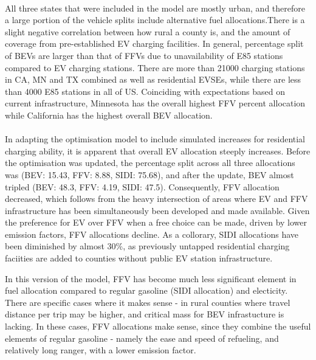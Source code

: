 \documentclass[answers]{exam}
\begin{document}
\\
All three states that were included in the model are mostly urban, and therefore a large portion of the vehicle splits include alternative fuel allocations.There is a slight negative correlation between how rural a county is, and the amount of coverage from pre-established EV charging facilities. In general, percentage split of BEVs are larger than that of FFVs due to unavailability of E85 stations compared to EV charging stations. There are more than 21000 charging stations in CA, MN and TX combined as well as residential EVSEs, while there are less than 4000 E85 stations in all of US. Coinciding with expectations based on current infrastructure, Minnesota has the overall highest FFV percent allocation while California has the highest overall BEV allocation.
\\ ~\\

In adapting the optimisation model to include simulated increases for residential charging ability, it is apparent that overall EV allocation steeply increases. Before the optimisation was updated, the percentage split across all three allocations was (BEV: 15.43, FFV: 8.88, SIDI: 75.68), and after the update, BEV almost tripled (BEV: 48.3, FFV: 4.19, SIDI: 47.5). Consequently, FFV allocation decreased, which follows from the heavy intersection of areas where EV and FFV infrastructure has been simultaneously been developed and made available. Given the preference for EV over FFV when a free choice can be made, driven by lower emission factors, FFV allocations decline. As a collorary, SIDI allocations have been diminished by almost 30\%, as previously untapped residential charging faciities are added to counties without public EV station infrastructure.

In this version of the model, FFV has become much less significant element in fuel allocation compared to regular gasoline (SIDI allocation) and electicity. There are specific cases where it makes sense - in rural counties where travel distance per trip may be higher, and critical mass for BEV infrastucture is lacking. In these cases, FFV allocations make sense, since they combine the useful elements of regular gasoline - namely the ease and speed of refueling, and relatively long ranger, with a lower emission factor.
\end{document}
